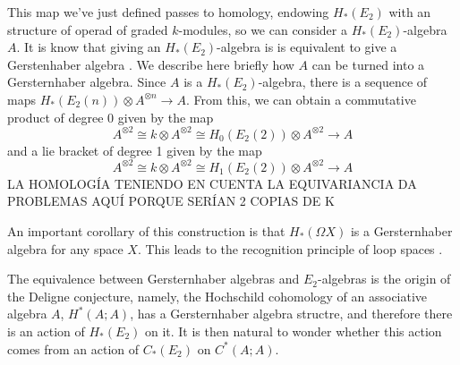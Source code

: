\documentclass[TFM.tex]{subfiles}
\begin{document}
This map we've just defined passes to homology, endowing $H_*(E_2)$ with an structure of operad of graded $k$-modules, so we can consider a $H_*(E_2)$-algebra $A$. It is know that giving an $H_*(E_2)$-algebra is is equivalent to give a Gerstenhaber algebra \cite{cuentas}. We describe here briefly how $A$ can be turned into a Gersternhaber algebra. Since $A$ is a $H_*(E_2)$-algebra, there is a sequence of maps $H_*(E_2(n))\otimes A^{\otimes n}\to A$. From this, we can obtain a commutative product of degree 0 given by the map
\[
A^{\otimes 2}\cong k\otimes A^{\otimes 2}\cong H_0(E_2(2))\otimes A^{\otimes 2}\to A
\]
and a lie bracket of degree 1 given by the map
\[
A^{\otimes 2}\cong k\otimes A^{\otimes 2}\cong H_1(E_2(2))\otimes A^{\otimes 2}\to A
\]
LA HOMOLOGÍA TENIENDO EN CUENTA LA EQUIVARIANCIA DA PROBLEMAS AQUÍ PORQUE SERÍAN 2 COPIAS DE K

An important corollary of this construction is that $H_*(\Omega X)$ is a Gersternhaber algebra for any space $X$. This leads to the recognition principle of loop spaces \cite{May}.

The equivalence between Gersternhaber algebras and $E_2$-algebras is the origin of the Deligne conjecture, namely, the Hochschild cohomology of an associative algebra $A$, $H^*(A;A)$, has a Gersternhaber algebra structre, and therefore there is an action of $H_*(E_2)$ on it. It is then natural to wonder whether this action comes from an action of $C_*(E_2)$ on $C^*(A;A)$. 



\end{document}
